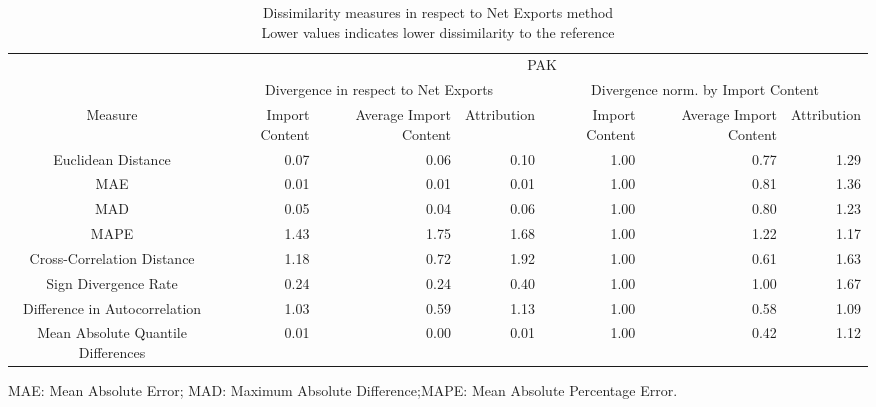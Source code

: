 \begin{table}[t]
\caption*{
{\large Dissimilarity measures in respect to Net Exports method} \\ 
{\small Lower values indicates lower dissimilarity to the reference}
} 
\fontsize{15.0pt}{18.0pt}\selectfont
\begin{tabular*}{\linewidth}{@{\extracolsep{\fill}}crrrrrr}
\toprule
 & \multicolumn{6}{c}{PAK} \\ 
\cmidrule(lr){2-7}
 & \multicolumn{3}{c}{Divergence in respect to Net Exports} & \multicolumn{3}{c}{Divergence norm. by Import Content} \\ 
\cmidrule(lr){2-4} \cmidrule(lr){5-7}
Measure & Import Content & Average Import Content & Attribution & Import Content & Average Import Content & Attribution \\ 
\midrule\addlinespace[2.5pt]
Euclidean Distance & 0.07 & 0.06 & 0.10 & 1.00 & 0.77 & 1.29 \\ 
MAE & 0.01 & 0.01 & 0.01 & 1.00 & 0.81 & 1.36 \\ 
MAD & 0.05 & 0.04 & 0.06 & 1.00 & 0.80 & 1.23 \\ 
MAPE & 1.43 & 1.75 & 1.68 & 1.00 & 1.22 & 1.17 \\ 
Cross-Correlation Distance & 1.18 & 0.72 & 1.92 & 1.00 & 0.61 & 1.63 \\ 
Sign Divergence Rate & 0.24 & 0.24 & 0.40 & 1.00 & 1.00 & 1.67 \\ 
Difference in Autocorrelation & 1.03 & 0.59 & 1.13 & 1.00 & 0.58 & 1.09 \\ 
Mean Absolute Quantile Differences & 0.01 & 0.00 & 0.01 & 1.00 & 0.42 & 1.12 \\ 
\bottomrule
\end{tabular*}
\begin{minipage}{\linewidth}
MAE: Mean Absolute Error; MAD: Maximum Absolute Difference;MAPE: Mean Absolute Percentage Error.\\
\end{minipage}
\end{table}

